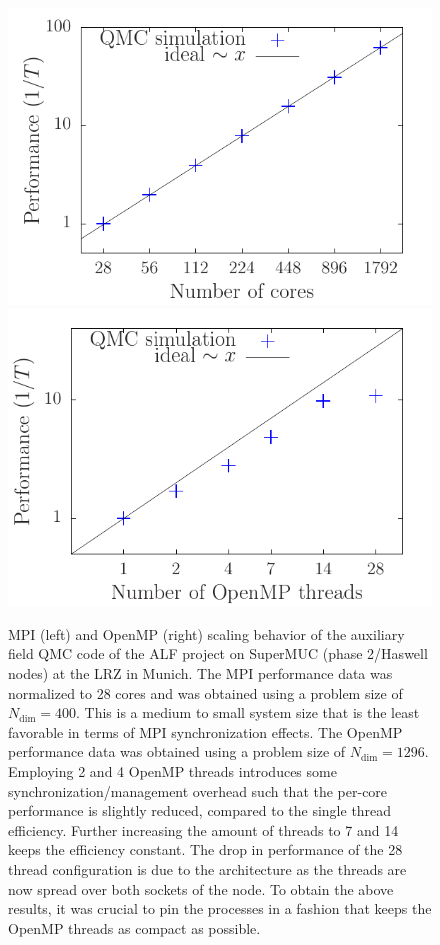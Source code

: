 \begin{figure}[H]
	\begin{center}
		\includegraphics[scale=0.6]{MPI_scaling_ALF_2.pdf}
		\includegraphics[scale=0.6]{OMP_scaling_ALF_2.pdf}
	\end{center}
	\caption{\label{fig_scaling} MPI (left) and OpenMP (right) scaling behavior of the auxiliary field QMC code of the ALF project on SuperMUC (phase 2/Haswell nodes) at the LRZ in Munich.
		The MPI performance data was normalized to 28 cores and was obtained using a problem size of $N_{\text{dim}}=400$. This is a medium to small system size that is the least favorable in terms of MPI synchronization effects.
		The OpenMP performance data was obtained using a problem size of $N_{\text{dim}}=1296$. Employing 2 and 4 OpenMP threads introduces some synchronization/management overhead such that the per-core performance is slightly reduced, compared to the single thread efficiency. Further increasing the amount of threads to 7 and 14 keeps the efficiency constant. The drop in performance of the 28 thread configuration is due to the architecture as the threads are now spread over both sockets of the node. To obtain the above results, it was crucial to pin the processes in a fashion that keeps the OpenMP threads as compact as possible.}
\end{figure}

